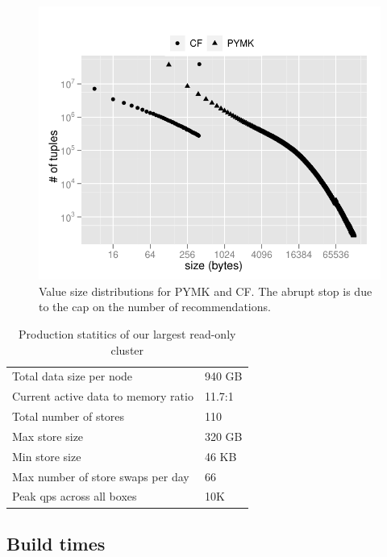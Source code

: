 \begin{figure}
  \centering
    \includegraphics[scale=0.55]{images/data_distribution.pdf}
  \caption{Value size distributions for PYMK and CF. The abrupt stop
is due to the cap on the number of recommendations.}
  \label{distribution}
\end{figure}

\begin{table}
\begin{center}
	\begin{tabular} { | l | l | }
	\hline
	Total data size per node &	940 GB			\\ 
	Current active data to memory ratio &	11.7:1		\\
	\hline
	Total number of stores &	110 	\\
	Max store size  &		320 GB	\\
	Min store size &		46 KB	\\
	Max number of store swaps per day & 66	\\
	\hline
	Peak qps across all boxes & 	10K \\
	\hline
	\end{tabular}
\end{center}
	\caption{Production statitics of our largest read-only cluster}
 	\label{tab:production_statistics}
\end{table}

\subsection{Build times}

